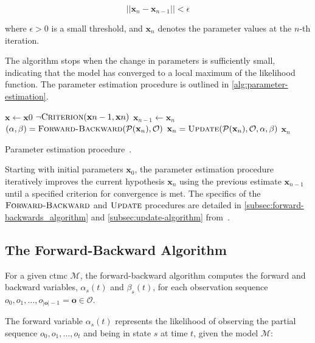 \begin{equation}
    ||\textbf{x}_n - \textbf{x}_{n-1}|| < \epsilon\label{eq:convergence-criterion}
\end{equation}

where $\epsilon > 0$ is a small threshold, and $\textbf{x}_n$ denotes the parameter values at the $n$-th iteration.

The algorithm stops when the change in parameters is sufficiently small, indicating that the model has converged to a local maximum of the likelihood function.
The parameter estimation procedure is outlined in \autoref{alg:parameter-estimation}.

\begin{algorithm}[htb!]
    \begin{codebox}
        \li $\mathbf{x} \gets \mathbf{x}0$
        \li \While $\neg\textnormal{\scshape Criterion}(\mathbf{x}{n-1}, \mathbf{x}n)$
        \li \Do $\mathbf{x}_{n - 1} \gets \mathbf{x}_n$
        \li $(\alpha, \beta) = \proc{Forward-Backward}(\mathcal{P}(\mathbf{x}_n), \mathcal{O})$
        \li $\mathbf{x}_n = \proc{Update}(\mathcal{P}(\mathbf{x}_n), \mathcal{O}, \alpha, \beta)$ \End
        \li \Return $\mathbf{x}_n$
    \end{codebox}
    \caption{Parameter estimation procedure~\cite{p7}.}
    \label{alg:parameter-estimation}
\end{algorithm}

Starting with initial parameters $\mathbf{x}_0$, the parameter estimation procedure iteratively improves the current hypothesis $\mathbf{x}_n$ using the previous estimate $\mathbf{x}_{n-1}$ until a specified criterion for convergence is met.
The specifics of the $\textnormal{\scshape Forward-Backward}$ and $\textnormal{\scshape Update}$ procedures are detailed in \autoref{subsec:forward-backwards_algorithm} and \autoref{subsec:update-algorithm} from~\cite{p7}.

\subsection{The Forward-Backward Algorithm}\label{subsec:forward-backwards_algorithm}
For a given \gls{ctmc} $\mathcal{M}$, the forward-backward algorithm computes the forward and backward variables, $\alpha_s(t)$ and $\beta_s(t)$, for each observation sequence $o_0, o_1, \dots, o_{|\mathbf{o}|-1} = \mathbf{o} \in \mathcal{O}$.

The forward variable $\alpha_s(t)$ represents the likelihood of observing the partial sequence $o_0, o_1, \dots, o_t$ and being in state $s$ at time $t$, given the model $\mathcal{M}$:


